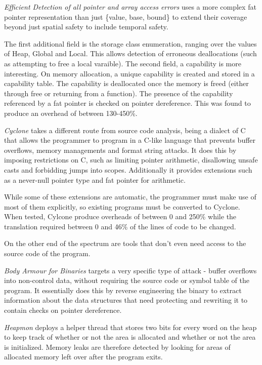\textit{Efficient Detection of all pointer and array access errors} \cite{austin1994efficient} uses a more complex fat pointer representation than just \{value, base, bound\} to extend their coverage beyond just spatial safety to include temporal safety.

The first additional field is the storage class enumeration, ranging over the values of Heap, Global and Local.
This allows detection of erroneous deallocations (such as attempting to free a local varaible).
The second field, a capability is more interesting.
On memory allocation, a unique capability is created and stored in a capability table.
The capability is deallocated once the memory is freed (either through free or returning from a function).
The presence of the capability referenced by a fat pointer is checked on pointer dereference.
This was found to produce an overhead of between 130-450\%.

\textit{Cyclone} \cite{jim2002cyclone} takes a different route from source code analysis, being a dialect of C that allows the programmer to program in a C-like language that prevents buffer overflows, memory managements and format string attacks.
It does this by imposing restrictions on C, such as limiting pointer arithmetic, disallowing unsafe casts and forbidding jumps into scopes.
Additionally it provides extensions such as a never-null pointer type and fat pointer for arithmetic.

While some of these extensions are automatic, the programmer must make use of most of them explicitly, so existing programs must be converted to Cyclone.
When tested, Cylcone produce overheads of between 0 and 250\% while the translation required between 0 and 46\% of the lines of code to be changed.

On the other end of the spectrum are tools that don't even need access to the source code of the program.

\textit{Body Armour for Binaries} \cite{slowinska2012body} targets a very specific type of attack - buffer overflows into non-control data, without requiring the source code or symbol table of the program.
It essentially does this by reverse engineering the binary to extract information about the data structures that need protecting and rewriting it to contain checks on pointer dereference.

\textit{Heapmon} \cite{shetty2005heapmon} deploys a helper thread that stores two bits for every word on the heap to keep track of whether or not the area is allocated and whether or not the area is initialized.
Memory leaks are therefore detected by looking for areas of allocated memory left over after the program exits.

